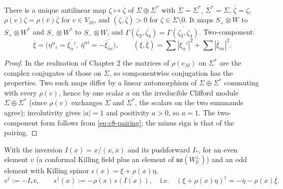 \begin{lemma}
\label{lem:c8-cc}
There is a unique antilinear map $\zeta\mapsto\overline\zeta$ of $\Sigma\oplus\Sigma^*$ with $\overline\Sigma=\Sigma^*$, $\overline{\Sigma^*}=\Sigma$, $\overline{\overline\zeta}=\zeta$, $\overline{\rho(v)\zeta}=\rho(\bar v)\overline\zeta$ for $v\in V_{10}$, and $(\zeta,\overline\zeta)>0$ for $\zeta\in\Sigma\setminus0$. It maps $S_+\otimes W$ to $S_+\otimes W^*$ and $S_-\otimes W^*$ to $S_-\otimes W$, and $\Gamma(\overline{\zeta_3},\overline{\zeta_4})=\overline{\Gamma(\zeta_3,\zeta_4)}$. Two-component:
\begin{equation}
\overline\xi=\big(\eta^\alpha{}_i=\overline{\xi_\alpha{}^i},\ \bar\eta^{\dot\alpha i}=-\overline{\bar\xi_{\dot\alpha i}}\big),\qquad (\xi,\overline\xi)=\sum|\xi_\alpha{}^i|^2+\sum|\bar\xi_{\dot\alpha i}|^2 .
\label{eq:c8-cc}
\end{equation}
\end{lemma}

\begin{proof}
In the realisation of Chapter 2 the matrices of $\rho(e_M)$ on $\Sigma^*$ are the complex conjugates of those on $\Sigma$, so componentwise conjugation has the properties. Two such maps differ by a linear automorphism of $\Sigma\oplus\Sigma^*$ commuting with every $\rho(v)$, hence by one scalar $a$ on the irreducible Clifford module $\Sigma\oplus\Sigma^*$ (since $\rho(v)$ exchanges $\Sigma$ and $\Sigma^*$, the scalars on the two summands agree); involutivity gives $|a|=1$ and positivity $a>0$, so $a=1$. The two-component form follows from \eqref{eq:c8-pairing}; the minus sign is that of the pairing.
\end{proof}

\begin{definition}
\label{def:c8-dag}
With the inversion $I(x)=x/(x,x)$ and its pushforward $I_*$, for an even element $v$ (a conformal Killing field plus an element of $\mathfrak{so}(W_{\mathbb R}^\perp)$) and an odd element with Killing spinor $\epsilon(x)=\xi+\rho(x)\eta$,
\[
v^\dagger:=-I_*\bar v,\qquad \epsilon^\dagger(x):=-\rho(x)\,\overline{\epsilon(I(x))},\quad\text{i.e.}\quad (\xi+\rho(x)\eta)^\dagger=-\overline\eta-\rho(x)\overline\xi .
\]
\end{definition}

